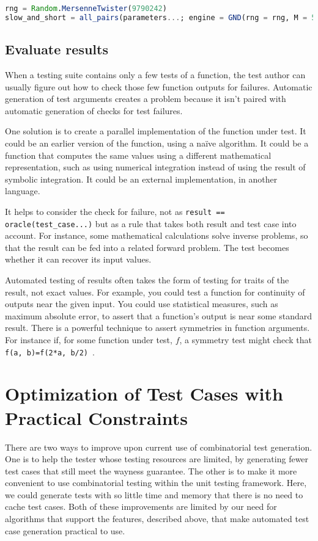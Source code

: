 \documentclass{juliacon}
\begin{document}
\begin{lstlisting}[language=Julia]
rng = Random.MersenneTwister(9790242)
slow_and_short = all_pairs(parameters...; engine = GND(rng = rng, M = 50))
\end{lstlisting}

\subsection{Evaluate results}

When a testing suite contains only a few tests of a function, the test author can usually figure out how to check those few function outputs for failures. Automatic generation of test arguments creates a problem because it isn't paired with automatic generation of checks for test failures.

\vskip 6pt
One solution is to create a parallel implementation of the function under test. It could be an earlier version of the function, using a na{\"i}ve algorithm. It could be a function that computes the same values using a different mathematical representation, such as using numerical integration instead of using the result of symbolic integration. It could be an external implementation, in another language.

\vskip 6pt
It helps to consider the check for failure, not as \verb|result == oracle(test_case...)| but as a rule that takes both result and test case into account. For instance, some mathematical calculations solve inverse problems, so that the result can be fed into a related forward problem. The test becomes whether it can recover its input values.

\vskip 6pt
Automated testing of results often takes the form of testing for traits of the result, not exact values. For example, you could test a function for continuity of outputs near the given input. You could use statistical measures, such as maximum absolute error, to assert that a function's output is near some standard result. There is a powerful technique to assert symmetries in function arguments. For instance if, for some function under test, $f$, a symmetry test might check that \verb|f(a, b)=f(2*a, b/2)|~\cite{Segura2016-qh}.


\section{Optimization of Test Cases with Practical Constraints}\label{sec:implementation}

There are two ways to improve upon current use of combinatorial test generation. One is to help the tester whose testing resources are limited, by generating fewer test cases that still meet the wayness guarantee. The other is to make it more convenient to use combinatorial testing within the unit testing framework. Here, we could generate tests with so little time and memory that there is no need to cache test cases. Both of these improvements are limited by our need for algorithms that support the features, described above, that make automated test case generation practical to use.
\end{document}
